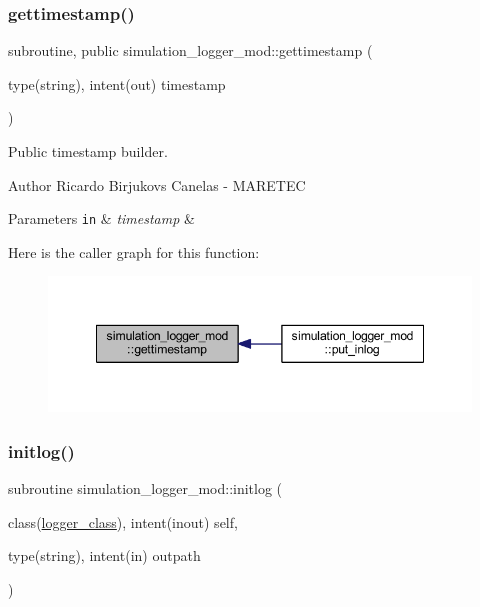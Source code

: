 \subsubsection{\texorpdfstring{gettimestamp()}{gettimestamp()}}
{\footnotesize\ttfamily subroutine, public simulation\+\_\+logger\+\_\+mod\+::gettimestamp (\begin{DoxyParamCaption}\item[{type(string), intent(out)}]{timestamp }\end{DoxyParamCaption})}



Public timestamp builder. 

\begin{DoxyAuthor}{Author}
Ricardo Birjukovs Canelas -\/ M\+A\+R\+E\+T\+EC 
\end{DoxyAuthor}

\begin{DoxyParams}[1]{Parameters}
\mbox{\tt in}  & {\em timestamp} & \\
\hline
\end{DoxyParams}
Here is the caller graph for this function\+:\nopagebreak
\begin{figure}[H]
\begin{center}
\leavevmode
\includegraphics[width=348pt]{namespacesimulation__logger__mod_a0326a5eeb649b041064a01d96aef0989_icgraph}
\end{center}
\end{figure}
\mbox{\label{namespacesimulation__logger__mod_abf603e657da9104a8060ab53c72f0aca}} 
\subsubsection{\texorpdfstring{initlog()}{initlog()}}
{\footnotesize\ttfamily subroutine simulation\+\_\+logger\+\_\+mod\+::initlog (\begin{DoxyParamCaption}\item[{class(\hyperlink{structsimulation__logger__mod_1_1logger__class}{logger\+\_\+class}), intent(inout)}]{self,  }\item[{type(string), intent(in)}]{outpath }\end{DoxyParamCaption})\hspace{0.3cm}{\ttfamily [private]}}



